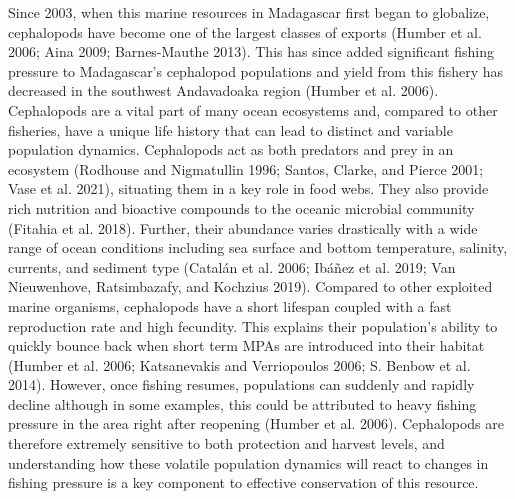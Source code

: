\documentclass[
]{article}
\begin{document}
Since 2003, when this marine resources in Madagascar first began to globalize, cephalopods have become one of the largest classes of exports (Humber et al. 2006; Aina 2009; Barnes-Mauthe 2013). This has since added significant fishing pressure to Madagascar's cephalopod populations and yield from this fishery has decreased in the southwest Andavadoaka region (Humber et al. 2006). Cephalopods are a vital part of many ocean ecosystems and, compared to other fisheries, have a unique life history that can lead to distinct and variable population dynamics. Cephalopods act as both predators and prey in an ecosystem (Rodhouse and Nigmatullin 1996; Santos, Clarke, and Pierce 2001; Vase et al. 2021), situating them in a key role in food webs. They also provide rich nutrition and bioactive compounds to the oceanic microbial community (Fitahia et al. 2018). Further, their abundance varies drastically with a wide range of ocean conditions including sea surface and bottom temperature, salinity, currents, and sediment type (Catalán et al. 2006; Ibáñez et al. 2019; Van Nieuwenhove, Ratsimbazafy, and Kochzius 2019). Compared to other exploited marine organisms, cephalopods have a short lifespan coupled with a fast reproduction rate and high fecundity. This explains their population's ability to quickly bounce back when short term MPAs are introduced into their habitat (Humber et al. 2006; Katsanevakis and Verriopoulos 2006; S. Benbow et al. 2014). However, once fishing resumes, populations can suddenly and rapidly decline although in some examples, this could be attributed to heavy fishing pressure in the area right after reopening (Humber et al. 2006). Cephalopods are therefore extremely sensitive to both protection and harvest levels, and understanding how these volatile population dynamics will react to changes in fishing pressure is a key component to effective conservation of this resource.
\end{document}
